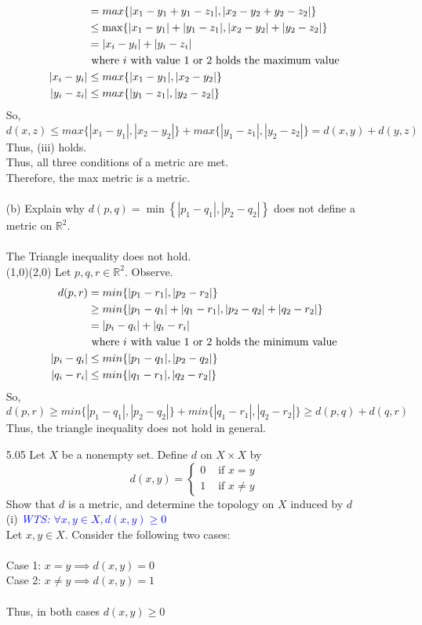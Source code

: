 \documentclass[12pt]{article}
\newcommand{\R}{\mathbb{R}}
\newcommand{\wts}[1]{\textit{\textcolor{blue}{WTS: #1}}\\}
\newcommand{\1}{^{-1}}
\begin{document}
\begin{enumerate}
\begin{align*}
		&= max\{|x_1-y_1+y_1-z_1|,|x_2-y_2+y_2-z_2|\}\\
		&\leq \max\{|x_1-y_1|+|y_1-z_1|,|x_2-y_2|+|y_2-z_2|\}\\
		&= |x_i-y_i|+|y_i-z_i| \\
		&\text{ where $ i $ with value 1 or 2 holds the maximum value}\\
		|x_i-y_i|&\leq max\{|x_1-y_1|,|x_2-y_2|\}\\
		|y_i-z_i|&\leq max\{|y_1-z_1|,|y_2-z_2|\}
		\end{align*}
		So, 
		\[d(x,z) \leq max\{|x_1-y_1|,|x_2-y_2|\} + max\{|y_1-z_1|,|y_2-z_2|\}=d(x,y)+d(y,z)\]
		Thus, (iii) holds.\\
		Thus, all three conditions of a metric are met.\\
		Therefore, the max metric is a metric.\\
		\\
		(b) Explain why $d(p, q)=\min \left\{\left|p_{1}-q_{1}\right|,\left|p_{2}-q_{2}\right|\right\}$ does not define a metric on $\mathbb{R}^{2}$.\\
		\\
		The Triangle inequality does not hold.\\ (1,0)(2,0)
		Let $ p,q,r \in \R^2 $. Observe.
		\begin{align*}
		d(p,r) &= min\{|p_1-r_1|,|p_2-r_2|\}\\
		&\geq min\{|p_1-q_1|+|q_1-r_1|,|p_2-q_2|+|q_2-r_2|\}\\
		&= |p_i-q_i|+|q_i-r_i|\\
		&\text{ where $ i $ with value 1 or 2 holds the minimum value}\\
		|p_i-q_i| &\leq min\{|p_1-q_1|,|p_2-q_2|\}\\
		|q_i-r_i| &\leq min\{|q_1-r_1|,|q_2-r_2|\}
		\end{align*}
		So, 
		\[d(p,r) \geq min\{|p_1-q_1|,|p_2-q_2|\} + min\{|q_1-r_1|,|q_2-r_2|\}\geq d(p,q)+d(q,r)\]
		Thus, the triangle inequality does not hold in general.
		\item[5.05]Let $X$ be a nonempty set. Define $d$ on $X \times X$ by
		$$
		d(x, y)=\left\{\begin{array}{ll}
		0 & \text { if } x=y \\
		1 & \text { if } x \neq y
		\end{array}\right.
		$$    
		Show that $d$ is a metric, and determine the topology on $X$ induced by $d$\\
		
		(i) \wts{$\forall x,y\in X, d(x, y) \geq 0$}
		Let $ x,y\in X $. Consider the following two cases:\\
		\\
		Case 1: $ x = y \implies d(x,y) = 0$\\
		Case 2: $ x \neq y \implies d(x,y) = 1$\\
		\\
		Thus, in both cases $ d(x,y) \geq 0 $\\
		

\end{enumerate}
\end{document}
